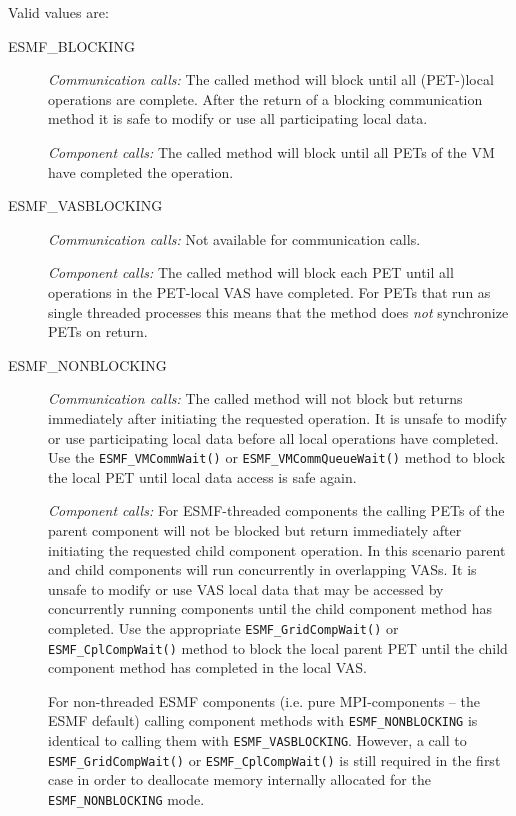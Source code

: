 Valid values are:
\begin{description}

\item [ESMF\_BLOCKING]
         {\em Communication calls:} The called method will block until all
         (PET-)local operations are complete. After the return of a blocking
         communication method it is safe to modify or use all participating
         local data.
         
         {\em Component calls:} The called method will block until all PETs of
         the VM have completed the operation.

\item [ESMF\_VASBLOCKING]
         {\em Communication calls:} Not available for communication calls.
         
         {\em Component calls:} The called method will block each PET until
         all operations in the PET-local VAS have completed. For PETs
         that run as single threaded processes this means that the method does
         {\em not} synchronize PETs on return.
         
\item [ESMF\_NONBLOCKING]
         {\em Communication calls:} The called method will not block but 
         returns immediately after initiating the requested operation. It is
         unsafe to modify or use participating local data before all local
         operations have completed. Use the {\tt ESMF\_VMCommWait()} or
         {\tt ESMF\_VMCommQueueWait()} method to block the local PET until
         local data access is safe again. 

         {\em Component calls:} For ESMF-threaded components the calling PETs
         of the parent component will not be blocked but return immediately
         after initiating the requested child component operation. In this
         scenario parent and child components will run concurrently in
         overlapping VASs. It is unsafe to modify or use VAS local data that
         may be accessed by concurrently running components until the child
         component method has completed. Use the appropriate
         {\tt ESMF\_GridCompWait()} or {\tt ESMF\_CplCompWait()} method to
         block the local parent PET until the child component method has
         completed in the local VAS.
         
         For non-threaded ESMF components (i.e. pure MPI-components -- the
         ESMF default) calling component methods with {\tt ESMF\_NONBLOCKING}
         is identical to calling them with {\tt ESMF\_VASBLOCKING}. However,
         a call to {\tt ESMF\_GridCompWait()} or {\tt ESMF\_CplCompWait()} is
         still required in the first case in order to deallocate memory
         internally allocated for the {\tt ESMF\_NONBLOCKING} mode.

\end{description}

